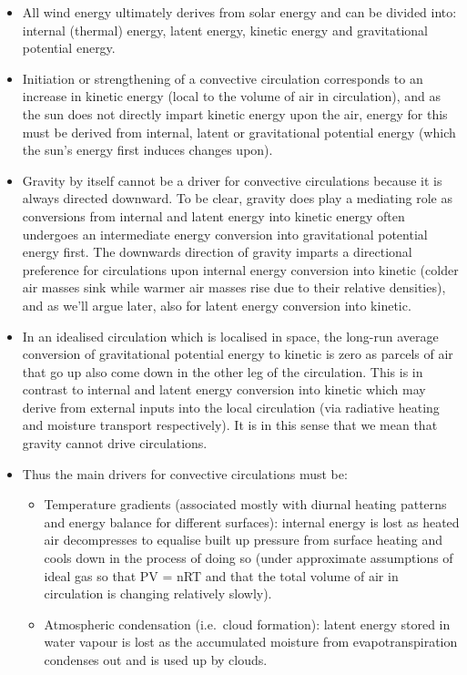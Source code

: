 \begin{itemize}
	\item All wind energy ultimately derives from solar energy and can be divided into: internal (thermal) energy, latent energy, kinetic energy and gravitational potential energy.
	\item Initiation or strengthening of a convective circulation corresponds to an increase in kinetic energy (local to the volume of air in circulation), and as the sun does not directly impart kinetic energy upon the air, energy for this must be derived from internal, latent or gravitational potential energy (which the sun’s energy first induces changes upon).
	\item Gravity by itself cannot be a driver for convective circulations because it is always directed downward. To be clear, gravity does play a mediating role as conversions from internal and latent energy into kinetic energy often undergoes an intermediate energy conversion into gravitational potential energy first. The downwards direction of gravity imparts a directional preference for circulations upon internal energy conversion into kinetic (colder air masses sink while warmer air masses rise due to their relative densities), and as we’ll argue later, also for latent energy conversion into kinetic.
	\item In an idealised circulation which is localised in space, the long-run average conversion of gravitational potential energy to kinetic is zero as parcels of air that go up also come down in the other leg of the circulation. This is in contrast to internal and latent energy conversion into kinetic which may derive from external inputs into the local circulation (via radiative heating and moisture transport respectively). It is in this sense that we mean that gravity cannot drive circulations.
	\item Thus the main drivers for convective circulations must be:
	\begin{itemize}
		\item Temperature gradients (associated mostly with diurnal heating patterns and energy balance for different surfaces): internal energy is lost as heated air decompresses to equalise built up pressure from surface heating and cools down in the process of doing so (under approximate assumptions of ideal gas so that PV = nRT and that the total volume of air in circulation is changing relatively slowly).
		\item Atmospheric condensation (i.e.\ cloud formation): latent energy stored in water vapour is lost as the accumulated moisture from evapotranspiration condenses out and is used up by clouds.

\end{itemize}
\end{itemize}
